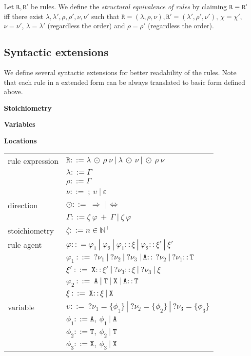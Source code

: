 \documentclass{entcs}
\renewcommand{\~}[0]{\texttildelow}
\begin{document}
\begin{defn}
Let $\mathtt{R},\mathtt{R}'$ be rules. We define the \emph{structural equivalence of rules} by claiming $\mathtt{R} \equiv \mathtt{R}'$ iff there exist $\lambda, \lambda', \rho, \rho', \nu, \nu'$ such that $\mathtt{R}=(\lambda, \rho, \nu),\mathtt{R}'=(\lambda', \rho', \nu')$, $\chi=\chi'$, $\nu = \nu'$, $\lambda=\lambda'$ (regardless the order) and $\rho=\rho'$ (regardless the order).
\end{defn}


\subsection{Syntactic extensions}

We define several syntactic extensions for better readability of the rules. Note that each rule in a extended form can be always translated to basic form defined above.

\textbf{Stoichiometry}

\textbf{Variables}

\textbf{Locations}

\begin{center}
{\small
\hspace*{-1cm}\begin{tabular}{ l l }
 rule expression & $\mathtt{R} ::= \lambda ~\odot~ \rho~\nu ~|~ \lambda ~\odot~\nu ~|~ \odot~ \rho~\nu $\\
  & $\lambda ::= \Gamma$\\
  & $\rho ::= \Gamma$\\
  & $\nu ::=~ ;~\upsilon ~|~ \varepsilon$\\
 direction & $\odot ::=~ \Rightarrow~|~\Leftrightarrow $\\
  & $\Gamma ::= \zeta~\varphi~ +~\Gamma ~|~ \zeta~\varphi$\\
 stoichiometry & $\zeta ::= n \in \mathbb{N}^+$\\
 rule agent & $\varphi :: = \varphi_1~|~\varphi_2~|~\varphi_1::\xi~|~\varphi_2::\xi'~|~\xi'$\\
  & $\varphi_1  ~::=~  ?\nu_1~|~?\nu_2~|~?\nu_3~|~\mathtt{A}::~?\nu_2~|~?\nu_1::\mathtt{T}$\\
  & $\xi' ~::=~ \mathtt{X}::\xi'~|~?\nu_3::\xi~|~?\nu_3~|~\xi$\\
  & $\varphi_2  ~::=~  \mathtt{A}~|~\mathtt{T}~|~\mathtt{X}~|~\mathtt{A}::\mathtt{T}$\\
  & $\xi  ~::=~  \mathtt{X}::\xi~|~\mathtt{X}$\\
 variable & $\upsilon ::=~?\nu_1=\{\phi_1\}~|~?\nu_2=\{\phi_2\}~|~?\nu_3=\{\phi_3\}$\\
  & $\phi_1 ::= \mathtt{A},~\phi_1~|~\mathtt{A}$\\
  & $\phi_2 ::= \mathtt{T},~\phi_2~|~\mathtt{T}$\\
  & $\phi_3 ::= \mathtt{X},~\phi_3~|~\mathtt{X}$\\
\end{tabular}
}
\end{center}
\end{document}
